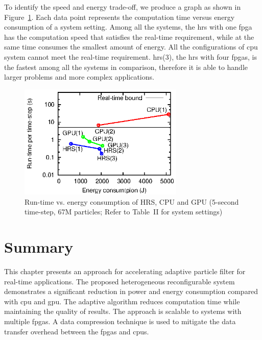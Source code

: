 To identify the speed and energy trade-off, we produce a graph as shown in Figure~\ref{fig:scale}. 
Each data point represents the computation time versus energy consumption of a system setting.
Among all the systems, the \gls{hrs} with one \gls{fpga} has the computation speed that satisfies the real-time requirement, while at the same time consumes the smallest amount of energy.
All the configurations of \gls{cpu} system cannot meet the real-time requirement.
\gls{hrs}(3), the \gls{hrs} with four \gls{fpga}s, is the fastest among all the systems in comparison, therefore it is able to handle larger problems and more complex applications.

\begin{figure}[t!]
\centering
\includegraphics[width=0.7\textwidth]{4_adaptation/figures/fig_scale}
\caption[Run-time vs. energy consumption of HRS, CPU and GPU]{Run-time vs. energy consumption of HRS, CPU and GPU (5-second time-step, 67M particles; Refer to Table~II for system settings)}
\label{fig:scale}
\end{figure}


\section{Summary}
\label{sec:reconfig_summary}

This chapter presents an approach for accelerating adaptive particle filter for real-time applications.
The proposed heterogeneous reconfigurable system demonstrates a significant reduction in power and energy consumption compared with \gls{cpu} and \gls{gpu}.
The adaptive algorithm reduces computation time while maintaining the quality of results. 
The approach is scalable to systems with multiple \gls{fpga}s.
A data compression technique is used to mitigate the data transfer overhead between the \gls{fpga}s and \gls{cpu}s.



